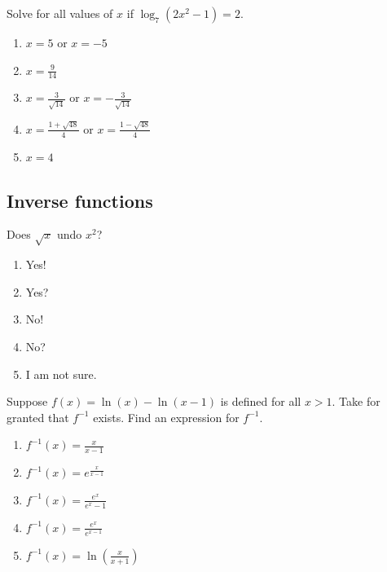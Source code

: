 \documentclass[aspectratio=169, 14pt, t]{beamer}  %
\begin{document}
\begin{poll}
  Solve for all values of \(x\) if \(\log_{7}(2x^{2}-1) = 2\).

  \begin{enumerate}
    \item \(x = 5\) or \(x = -5\)
    \item \(x = \frac{9}{14}\)
    \item \(x = \frac{3}{\sqrt{14}}\) or \(x = - \frac{3}{\sqrt{14}}\)
    \item \(x = \frac{1+\sqrt{48}}{4}\) or \(x = \frac{1 - \sqrt{48}}{4}\)
    \item \(x = 4\)
  \end{enumerate}
\end{poll}

\subsection{Inverse functions}

\begin{poll}
  Does \(\sqrt{x}\) undo \(x^{2}\)?


  \begin{enumerate}
    \item Yes! 
    \item Yes?
    \item No! 
    \item No?
    \item I am not sure.
  \end{enumerate}
\end{poll}

\begin{poll}
  Suppose \(f(x) = \ln(x) - \ln(x-1)\) is defined for all \(x > 1\). Take for granted that \(f^{-1}\) exists. Find an expression for \(f^{-1}\).

  \begin{enumerate}
    \item \(f^{-1}(x) = \frac{x}{x-1}\)
    \item \(f^{-1}(x) = e^{\frac{x}{x-1}}\)
    \item \(f^{-1}(x) = \frac{e^{x}}{e^{x}-1}\) %
    \item \(f^{-1}(x) = \frac{e^{x}}{e^{x-1}}\)
    \item \(f^{-1}(x) = \ln\left(\frac{x}{x+1}\right)\)
  \end{enumerate}
\end{poll}
\end{document}
